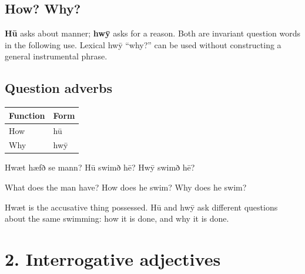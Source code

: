 \subsection*{How? Why?}

\textbf{Hū} asks about manner; \textbf{hwȳ} asks for a reason. Both are invariant question words in the following use. Lexical hwȳ “why?” can be used without constructing a general instrumental phrase.

\subsection*{Question adverbs}

\par\begingroup
\fontsize{10.5}{13.2}\selectfont
\setlength{\LTleft}{0pt}\setlength{\LTright}{\fill}
\noindent
\begin{tabular}{@{}>{\raggedright\arraybackslash}p{60.59mm}>{\raggedright\arraybackslash}p{60.59mm}@{}}
\toprule
\textbf{Function} & \textbf{Form} \\
\midrule
How & hū \\
Why & hwȳ \\
\bottomrule
\end{tabular}
\par\endgroup

Hwæt hæfð se mann? Hū swimð hē? Hwȳ swimð hē?

What does the man have? How does he swim? Why does he swim?

Hwæt is the accusative thing possessed. Hū and hwȳ ask different questions about the same swimming: how it is done, and why it is done.

\section*{2. Interrogative adjectives}

